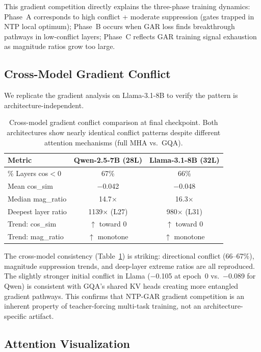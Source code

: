 \documentclass[11pt,a4paper]{article}
\begin{document}
This gradient competition directly explains the three-phase training dynamics:
Phase~A corresponds to high conflict + moderate suppression (gates trapped in NTP local optimum);
Phase~B occurs when GAR loss finds breakthrough pathways in low-conflict layers;
Phase~C reflects GAR training signal exhaustion as magnitude ratios grow too large.

\subsection{Cross-Model Gradient Conflict}

We replicate the gradient analysis on Llama-3.1-8B to verify the pattern is architecture-independent.

\begin{table}[h]
\centering
\caption{Cross-model gradient conflict comparison at final checkpoint. Both architectures show nearly identical conflict patterns despite different attention mechanisms (full MHA vs.\ GQA).}
\label{tab:grad-cross}
\begin{tabular}{lcc}
\toprule
\textbf{Metric} & \textbf{Qwen-2.5-7B (28L)} & \textbf{Llama-3.1-8B (32L)} \\
\midrule
\% Layers cos$<$0    & 67\%   & 66\% \\
Mean cos\_sim        & $-$0.042 & $-$0.048 \\
Median mag\_ratio    & 14.7$\times$ & 16.3$\times$ \\
Deepest layer ratio  & 1139$\times$ (L27) & 980$\times$ (L31) \\
Trend: cos\_sim      & $\uparrow$ toward 0 & $\uparrow$ toward 0 \\
Trend: mag\_ratio    & $\uparrow$ monotone  & $\uparrow$ monotone \\
\bottomrule
\end{tabular}
\end{table}

The cross-model consistency (Table~\ref{tab:grad-cross}) is striking: directional conflict (66--67\%), magnitude suppression trends, and deep-layer extreme ratios are all reproduced.
The slightly stronger initial conflict in Llama ($-$0.105 at epoch~0 vs.\ $-$0.089 for Qwen) is consistent with GQA's shared KV heads creating more entangled gradient pathways.
This confirms that NTP-GAR gradient competition is an inherent property of teacher-forcing multi-task training, not an architecture-specific artifact.

\subsection{Attention Visualization}
\end{document}
